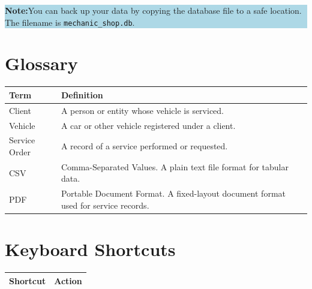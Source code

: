 \documentclass[12pt, a4paper]{report}
\newcommand{\notebox}[1]{%
	\vspace{6pt}
	\noindent
	\colorbox{LightBlue}{%
		\begin{minipage}{\dimexpr\linewidth-2\fboxsep}%
			\vspace{5pt}
			\small\textbf{\color{Blue}Note:\space}\color{Navy}#1
			\vspace{5pt}
		\end{minipage}%
	}
	\vspace{6pt}
}
\begin{document}
	\notebox{You can back up your data by copying the database file to a safe
		location. The filename is \texttt{mechanic\_shop.db}.}
	
	\appendix
	
	\chapter{Glossary}
	
	\begin{tabularx}{\textwidth}{l X}
		\toprule
		\textbf{Term} & \textbf{Definition} \\
		\midrule
		Client        & A person or entity whose vehicle is serviced. \\
		Vehicle       & A car or other vehicle registered under a client. \\
		Service Order & A record of a service performed or requested. \\
		CSV           & Comma-Separated Values. A plain text file format
		for tabular data. \\
		PDF           & Portable Document Format. A fixed-layout document
		format used for service records. \\
		\bottomrule
	\end{tabularx}
	
	\chapter{Keyboard Shortcuts}
	
	\begin{tabularx}{\textwidth}{l X}
		\toprule
		\textbf{Shortcut} & \textbf{Action} \\
		\midrule
		\bottomrule
	\end{tabularx}
	
\end{document}
